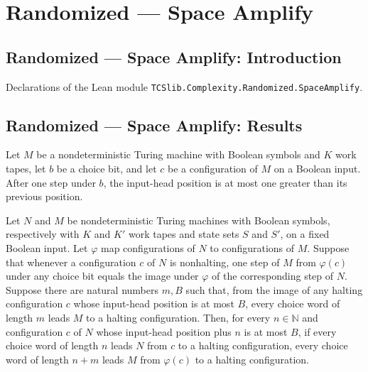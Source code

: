 \section{Randomized --- Space Amplify}
\subsection*{Randomized --- Space Amplify: Introduction}

Declarations of the Lean module \texttt{TCSlib.Complexity.Randomized.SpaceAmplify}.

\subsection*{Randomized --- Space Amplify: Results}

\begin{theorem}
\label{Randomized.Amplify.inputPos_stepWith_le}
\leanok
{}
Let $M$ be a nondeterministic Turing machine with Boolean symbols and $K$ work tapes,
let $b$ be a choice bit, and let $c$ be a configuration of $M$ on a Boolean input. After
one step under $b$, the input-head position is at most one greater than its previous
position.
\end{theorem}

\begin{theorem}
\label{Randomized.Amplify.halts_comp_pos}
\leanok
{}
Let $N$ and $M$ be nondeterministic Turing machines with Boolean symbols, respectively
with $K$ and $K'$ work tapes and state sets $S$ and $S'$, on a fixed Boolean input. Let
$\varphi$ map configurations of $N$ to configurations of $M$. Suppose that whenever a
configuration $c$ of $N$ is nonhalting, one step of $M$ from $\varphi(c)$ under any
choice bit equals the image under $\varphi$ of the corresponding step of $N$. Suppose
there are natural numbers $m,B$ such that, from the image of any halting configuration
$c$ whose input-head position is at most $B$, every choice word of length $m$ leads $M$
to a halting configuration. Then, for every $n\in\mathbb{N}$ and configuration $c$ of
$N$ whose input-head position plus $n$ is at most $B$, if every choice word of length
$n$ leads $N$ from $c$ to a halting configuration, every choice word of length $n+m$
leads $M$ from $\varphi(c)$ to a halting configuration.
\end{theorem}

